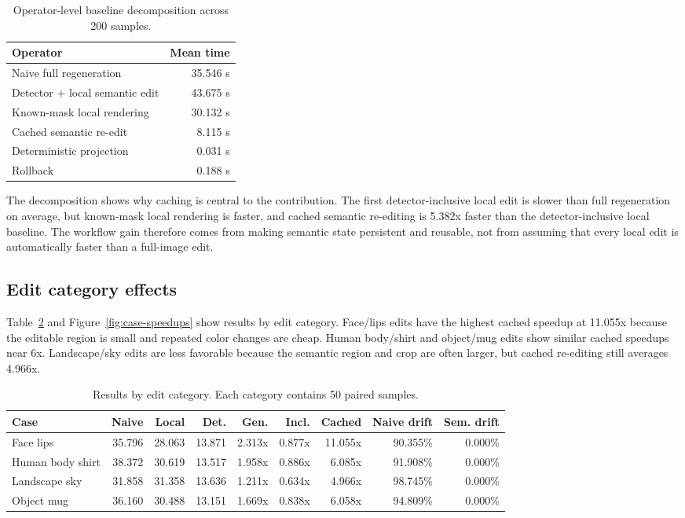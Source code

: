 \documentclass[final,5p,times,number,sort&compress]{elsarticle}
\begin{document}
\begin{table}[t]
\centering
\scriptsize
\caption{Operator-level baseline decomposition across 200 samples.}
\label{tab:baseline-decomp}
\begin{tabular}{lr}
\toprule
Operator & Mean time \\
\midrule
Naive full regeneration & 35.546 s \\
Detector + local semantic edit & 43.675 s \\
Known-mask local rendering & 30.132 s \\
Cached semantic re-edit & 8.115 s \\
Deterministic projection & 0.031 s \\
Rollback & 0.188 s \\
\bottomrule
\end{tabular}
\end{table}

The decomposition shows why caching is central to the contribution. The first detector-inclusive local edit is slower than full regeneration on average, but known-mask local rendering is faster, and cached semantic re-editing is 5.382x faster than the detector-inclusive local baseline. The workflow gain therefore comes from making semantic state persistent and reusable, not from assuming that every local edit is automatically faster than a full-image edit.

\subsection{Edit category effects}

Table~\ref{tab:cases} and Figure~\ref{fig:case-speedups} show results by edit category. Face/lips edits have the highest cached speedup at 11.055x because the editable region is small and repeated color changes are cheap. Human body/shirt and object/mug edits show similar cached speedups near 6x. Landscape/sky edits are less favorable because the semantic region and crop are often larger, but cached re-editing still averages 4.966x.

\begin{table}[t]
\centering
\scriptsize
\setlength{\tabcolsep}{3.5pt}
\caption{Results by edit category. Each category contains 50 paired samples.}
\label{tab:cases}
\begin{tabular}{lrrrrrrrr}
\toprule
Case & Naive & Local & Det. & Gen. & Incl. & Cached & Naive drift & Sem. drift \\
\midrule
Face lips & 35.796 & 28.063 & 13.871 & 2.313x & 0.877x & 11.055x & 90.355\% & 0.000\% \\
Human body shirt & 38.372 & 30.619 & 13.517 & 1.958x & 0.886x & 6.085x & 91.908\% & 0.000\% \\
Landscape sky & 31.858 & 31.358 & 13.636 & 1.211x & 0.634x & 4.966x & 98.745\% & 0.000\% \\
Object mug & 36.160 & 30.488 & 13.151 & 1.669x & 0.838x & 6.058x & 94.809\% & 0.000\% \\
\bottomrule
\end{tabular}
\end{table}
\end{document}
